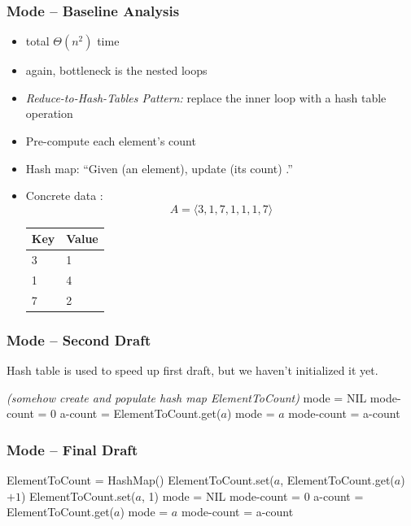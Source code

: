 \documentclass[10pt]{beamer}
\begin{document}
\begin{frame} \frametitle{Mode -- Baseline Analysis}
  \begin{itemize}
    \item total $\Theta(n^2)$ time
    \item again, bottleneck is the nested loops
    \item \emph{Reduce-to-Hash-Tables Pattern:} replace the inner loop with a hash table operation
    \item Pre-compute each element's count
    \item Hash map:  ``Given (an element), update (its count) .''
    \item Concrete data :
    \[A = \langle 3, 1, 7, 1, 1, 1, 7 \rangle \]
    \begin{center}
      \begin{tabular}{ll}
        \textbf{Key} & \textbf{Value} \\ \hline
        3 & 1 \\
        1 & 4 \\
        7 & 2 \\
      \end{tabular}
    \end{center}
  \end{itemize}
\end{frame}


\begin{frame} \frametitle{Mode -- Second Draft}
  Hash table is used to speed up first draft, but we haven't initialized it yet.
  \vspace{12pt}

  {\footnotesize
  \begin{algorithmic}[1]
    \State \emph{(somehow create and populate hash map ElementToCount)}
    \State mode = NIL
    \State mode-count = 0
        \State a-count = ElementToCount.get($a$)
          \State mode = $a$
          \State mode-count = a-count
      \EndIf
    \EndFor
    \State {}
    \EndFunction
  \end{algorithmic}
  }
\end{frame}


\begin{frame} \frametitle{Mode -- Final Draft}
  {\footnotesize
  \begin{algorithmic}[1]
    \State ElementToCount = HashMap()
        \State ElementToCount.set($a$, ElementToCount.get($a$) $+ 1$)
      \Else
        \State ElementToCount.set($a$, 1)
      \EndIf
    \EndFor
    \State mode = NIL
    \State mode-count = 0
        \State a-count = ElementToCount.get($a$)
          \State mode = $a$
          \State mode-count = a-count
      \EndIf
    \EndFor
    \State {}
    \EndFunction
  \end{algorithmic}
  }
\end{frame}
\end{document}
